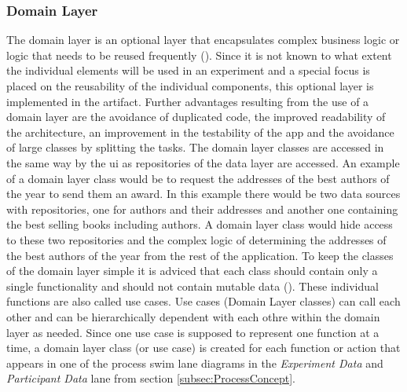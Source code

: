 
\subsubsection{Domain Layer}

The domain layer is an optional layer that encapsulates complex business logic or logic that needs to be reused frequently (\cite{Google.2023}). Since it is not known to what extent the individual elements will be used in an experiment and a special focus is placed on the reusability of the individual components, this optional layer is implemented in the artifact. Further advantages resulting from the use of a domain layer are the avoidance of duplicated code, the improved readability of the architecture, an improvement in the testability of the app and the avoidance of large classes by splitting the tasks. The domain layer classes are accessed in the same way by the \ac{ui} as repositories of the data layer are accessed. An example of a domain layer class would be to request the addresses of the best authors of the year to send them an award. In this example there would be two data sources with repositories, one for authors and their addresses and another one containing the best selling books including authors. A domain layer class would hide access to these two repositories and the complex logic of determining the addresses of the best authors of the year from the rest of the application. To keep the classes of the domain layer simple it is adviced that each class should contain only a single functionality and should not contain mutable data (\cite{Google.2023}). These individual functions are also called use cases. Use cases (Domain Layer classes) can call each other and can be hierarchically dependent with each othre within the domain layer as needed. Since one use case is supposed to represent one function at a time, a domain layer class (or use case) is created for each function or action  that appears in one of the process swim lane diagrams in the \textit{Experiment Data} and \textit{Participant Data} lane from section \ref{subsec:ProcessConcept}. 



